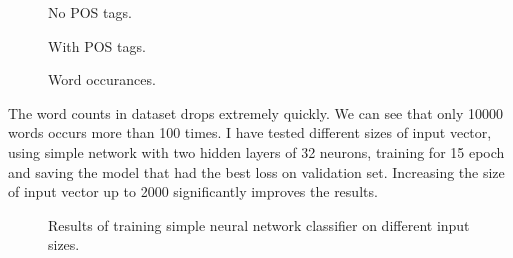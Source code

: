 \documentclass{article}
\begin{document}
\begin{figure}[h]
	\centering

	\begin{minipage}{0.3\textwidth}
        \centering
		
		\caption{No POS tags.}
	\end{minipage}
	\begin{minipage}{0.3\textwidth}
        \centering
		
		\caption{With POS tags.}
	\end{minipage}
	\begin{minipage}{0.35\textwidth}
        \centering
			\caption{Word occurances.}
    \end{minipage}
\end{figure}

The word counts in dataset drops extremely quickly. We can see that only 10000 words
occurs more than 100 times. I have tested different sizes of input vector, using simple
network with two hidden layers of 32 neurons, training for 15 epoch and saving the model that
had the best loss on validation set. Increasing the size of input vector up to 2000
significantly improves the results.

\begin{figure}[h]	
	\begin{center}
		\scalebox{0.3}{}
        \caption{Results of training simple neural network classifier on different input sizes.}
	\end{center}
\end{figure}
\end{document}
